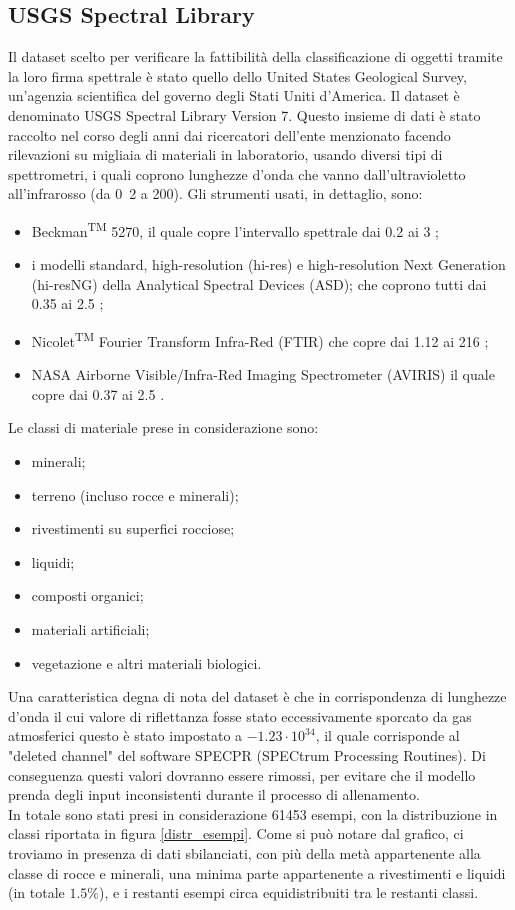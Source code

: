 \subsection{USGS Spectral Library}
Il dataset scelto per verificare la fattibilità della classificazione di oggetti tramite la loro firma spettrale è stato quello dello United States
Geological Survey, un'agenzia scientifica del governo degli Stati Uniti d'America.
Il dataset è denominato USGS Spectral Library Version 7.
Questo insieme di dati è stato raccolto nel corso degli anni dai ricercatori dell'ente menzionato facendo rilevazioni su migliaia di materiali in laboratorio,
usando diversi tipi di spettrometri, i quali coprono lunghezze d'onda che vanno dall'ultravioletto all'infrarosso (da \unit{0.2}{\micro\meter} a \unit{200}{\micro\meter}).
Gli strumenti usati, in dettaglio, sono:
\begin{itemize}
    \item Beckman\textsuperscript{TM} 5270, il quale copre l'intervallo spettrale dai 0.2 ai 3 \micro\meter;
    \item i modelli standard, high-resolution (hi-res) e high-resolution Next Generation (hi-resNG) della Analytical Spectral Devices (ASD);
          che coprono tutti dai 0.35 ai 2.5 \micro\meter;
    \item Nicolet\textsuperscript{TM} Fourier Transform Infra-Red (FTIR) che copre dai 1.12 ai 216 \micro\meter;
    \item NASA Airborne Visible/Infra-Red Imaging Spectrometer (AVIRIS) il quale copre dai 0.37 ai 2.5 \micro\meter.
\end{itemize}
Le classi di materiale prese in considerazione sono:
\begin{itemize}
    \item minerali;
    \item terreno (incluso rocce e minerali);
    \item rivestimenti su superfici rocciose;
    \item liquidi;
    \item composti organici;
    \item materiali artificiali;
    \item vegetazione e altri materiali biologici.
\end{itemize}
Una caratteristica degna di nota del dataset è che in corrispondenza di lunghezze d'onda il cui valore di riflettanza fosse stato eccessivamente sporcato da gas atmosferici questo è stato impostato a $-1.23 \cdot 10^{34}$, il quale corrisponde al "deleted channel" del software SPECPR (SPECtrum Processing Routines). Di conseguenza questi valori dovranno essere rimossi, per evitare che il modello prenda degli input inconsistenti durante il processo di allenamento.\\
In totale sono stati presi in considerazione 61453 esempi, con la distribuzione in classi riportata in figura \ref{distr_esempi}. Come si può notare dal grafico, ci troviamo in presenza di dati sbilanciati, con più della metà appartenente alla classe di rocce e minerali, una minima parte appartenente a rivestimenti e liquidi (in totale $1.5\%$), e i restanti esempi circa equidistribuiti tra le restanti classi.

